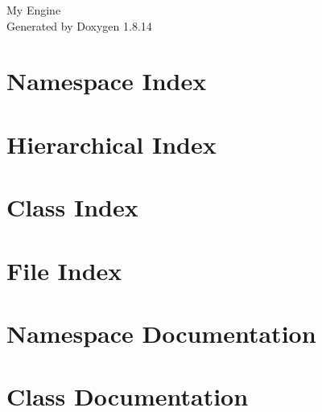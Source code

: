 \documentclass[twoside]{book}
\newcommand{\+}{\discretionary{\mbox{\scriptsize$\hookleftarrow$}}{}{}}
\newcommand{\clearemptydoublepage}{%
  \newpage{\pagestyle{empty}\cleardoublepage}%
}
\begin{document}
\hypersetup{pageanchor=false,
             bookmarksnumbered=true,
             pdfencoding=unicode
            }
\begin{titlepage}
\vspace*{7cm}
\begin{center}%
{\Large My Engine }\\
\vspace*{1cm}
{\large Generated by Doxygen 1.8.14}\\
\end{center}
\end{titlepage}
\clearemptydoublepage
{}
\tableofcontents
\clearemptydoublepage
{}
\hypersetup{pageanchor=true}

\chapter{Namespace Index}

\chapter{Hierarchical Index}

\chapter{Class Index}

\chapter{File Index}

\chapter{Namespace Documentation}

\chapter{Class Documentation}





























\end{document}
